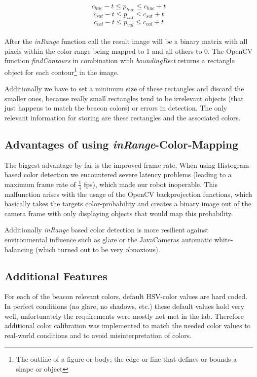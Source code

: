 \documentclass[703031]{iisreport}
\begin{document}
\[c_{hue} - t \le p_{hue} \le c_{hue} + t\]
\[c_{sat} - t \le p_{sat} \le c_{sat} + t\]
\[c_{val} - t \le p_{val} \le c_{val} + t\]\\
After the \emph{inRange} function call\cite{opencv_man_arrays} the result image will be a binary matrix with all pixels within the color range being mapped to 1 and all others to 0. The OpenCV function \emph{findContours}\cite{opencv_man_struct_analysis} in combination with \emph{boundingRect}\cite{opencv_man_struct_analysis} returns a rectangle object for each contour\footnote{The outline of a figure or body; the edge or line that defines or bounds a shape or object\cite{dict_contour}} in the image.

Additionally we have to set a minimum size of these rectangles and discard the smaller ones, because really small rectangles tend to be irrelevant objects (that just happens to match the beacon colors) or errors in detection.
The only relevant information for storing are these rectangles and the associated colors.

\subsection{Advantages of using \emph{inRange}-Color-Mapping}
The biggest advantage by far is the improved frame rate. When using Histogram-based color detection we encountered severe latency problems (leading to a maximum frame rate of $\frac{1}{4}$ fps), which made our robot inoperable. This malfunction arises with the usage of the OpenCV backprojection functions, which basically takes the targets color-probability and creates a binary image out of the camera frame with only displaying objects that would map this probability.

Additionally \emph{inRange} based color detection is more resilient against environmental influence such as glare or the JavaCameras automatic white-balancing (which turned out to be very obnoxious).

\subsection{Additional Features}
For each of the beacon relevant colors, default HSV-color values are hard coded. In perfect conditions (no glare, no shadows, etc.) these default values hold very well, unfortunately the requirements were mostly not met in the lab. Therefore additional color calibration was implemented to match the needed color values to real-world conditions and to avoid misinterpretation of colors.
\end{document}

